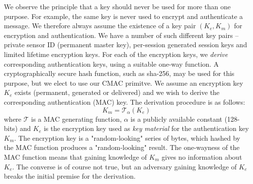 We observe the principle that a key should never be used for more than one purpose. For example, the same key is never used to encrypt and authenticate a message. We therefore always assume the existence of a key pair $(K_e,K_m)$ for encryption and authentication.
%
We have a number of such different key pairs -- private sensor ID (permanent master key), per-session generated session keys and limited lifetime encryption keys. For each of the encryption keys, we \textit{derive} corresponding authentication keys, using a suitable one-way function. A cryptographically secure hash function, such as sha-256, may be used for this purpose, but we elect to use our CMAC primitve. We assume an encryption key $K_e$ exists (permanent, generated or delivered) and we wish to derive the corresponding authentication (MAC) key. The derivation procedure is as follows:
\[
K_m = \mathcal{T}_\alpha(K_e)
\]
where $\mathcal{T}$ is a MAC generating function, $\alpha$ is a publicly available constant (128-bits) and $K_e$ is the encryption key used as \textit{key material} for the authentication key $K_m$. The encryption key is a "random-looking" series of bytes, which hashed by the MAC function produces a "random-looking" result. The one-wayness of the MAC function means that gaining knowledge of $K_m$ gives no information about $K_e$. The converse is of course not true, but an adversary gaining knowledge of $K_e$ breaks the initial premise for the derivation. 


